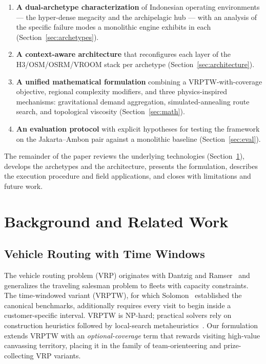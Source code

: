 \documentclass[11pt,a4paper,twocolumn]{article}
\begin{document}
\begin{enumerate}[leftmargin=1.4em, itemsep=0.15em]
  \item \textbf{A dual-archetype characterization} of Indonesian operating
    environments --- the hyper-dense megacity and the archipelagic hub ---
    with an analysis of the specific failure modes a monolithic engine
    exhibits in each (Section~\ref{sec:archetypes}).
  \item \textbf{A context-aware architecture} that reconfigures each layer
    of the H3/OSM/OSRM/VROOM stack per archetype
    (Section~\ref{sec:architecture}).
  \item \textbf{A unified mathematical formulation} combining a
    VRPTW-with-coverage objective, regional complexity modifiers, and three
    physics-inspired mechanisms: gravitational demand aggregation,
    simulated-annealing route search, and topological viscosity
    (Section~\ref{sec:math}).
  \item \textbf{An evaluation protocol} with explicit hypotheses for
    testing the framework on the Jakarta--Ambon pair against a monolithic
    baseline (Section~\ref{sec:eval}).
\end{enumerate}

The remainder of the paper reviews the underlying technologies
(Section~\ref{sec:background}), develops the archetypes and the
architecture, presents the formulation, describes the execution procedure
and field applications, and closes with limitations and future work.

\section{Background and Related Work}
\label{sec:background}

\subsection{Vehicle Routing with Time Windows}

The vehicle routing problem (VRP) originates with Dantzig and
Ramser~\cite{dantzig1959} and generalizes the traveling salesman problem to
fleets with capacity constraints. The time-windowed variant (VRPTW), for
which Solomon~\cite{solomon1987} established the canonical benchmarks,
additionally requires every visit to begin inside a customer-specific
interval. VRPTW is NP-hard; practical solvers rely on construction
heuristics followed by local-search metaheuristics~\cite{toth2014,
braysy2005}. Our formulation extends VRPTW with an \emph{optional-coverage}
term that rewards visiting high-value canvassing territory, placing it in
the family of team-orienteering and prize-collecting VRP variants.
\end{document}
